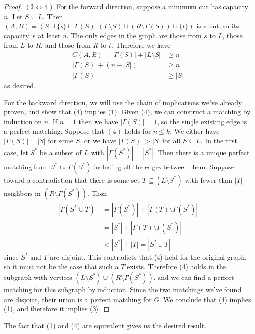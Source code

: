 \documentclass[11pt]{article}
\begin{document}
\begin{proof}
  $(3 \iff 4)$ For the forward direction, suppose a minimum cut has capacity $n$.
  Let $S \subseteq L$.
  Then $(A, B) = (S \cup \{s\} \cup \Gamma(S), (L \setminus S) \cup (R \setminus \Gamma(S)) \cup \{t\})$ is a cut, so its capacity is at least $n$.
  The only edges in the graph are those from $s$ to $L$, those from $L$ to $R$, and those from $R$ to $t$.
  Therefore we have
  \begin{align*}
    C(A, B) = |\Gamma(S)| + |L \setminus S| &\geq n\\
    |\Gamma(S)| + (n - |S|) &\geq n\\
    |\Gamma(S)| &\geq |S|
  \end{align*} as desired.

  For the backward direction, we will use the chain of implications we've already proven, and show that (4) implies (1).
  Given (4), we can construct a matching by induction on $n$.
  If $n = 1$ then we have $|\Gamma(S)| = 1$, so the single existing edge is a perfect matching.
  Suppose that $(4)$ holds for $n \leq k$.
  We either have $|\Gamma(S)| = |S|$ for some $S$, or we have $|\Gamma(S)| > |S|$ for all $S \subseteq L$.
  In the first case, let $S^*$ be a subset of $L$ with $|\Gamma(S^*)| = |S^*|$.
  Then there is a unique perfect matching from $S^*$ to $\Gamma(S^*)$ including all the edges between them.
  Suppose toward a contradiction that there is some set $T \subseteq (L \setminus S^*)$ with fewer than $|T|$ neighbors in $(R \setminus \Gamma(S^*))$.
  Then
  \begin{align*}
    |\Gamma(S^* \cup T)| &= |\Gamma(S^*)| + |\Gamma(T) \setminus \Gamma(S^*)|\\
    &= |S^*| + |\Gamma(T) \setminus \Gamma(S^*)|\\
    &< |S^*| + |T| = |S^* \cup T|
  \end{align*} since $S^*$ and $T$ are disjoint.
  This contradicts that (4) held for the original graph, so it must not be the case that such a $T$ exists.
  Therefore (4) holds in the subgraph with vertices $(L \setminus S^*) \cup (R \setminus \Gamma(S^*))$, and we can find a perfect matching for this subgraph by induction.
  Since the two matchings we've found are disjoint, their union is a perfect matching for $G$.
  We conclude that (4) implies (1), and therefore it implies (3).
\end{proof}

The fact that (1) and (4) are equivalent gives us the desired result.
\end{document}
